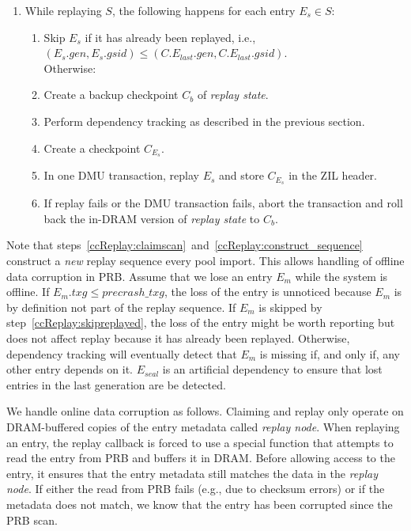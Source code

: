 \documentclass[12pt,a4paper,twoside]{book}
\begin{document}
\begin{enumerate}[noitemsep,beginpenalty=100000,midpenalty=100000]
    \item While replaying $S$, the following happens for each entry $E_s \in S$:
        \begin{enumerate}[noitemsep,beginpenalty=100000,midpenalty=100000]
            \item \label{ccReplay:skipreplayed} Skip $E_s$ if it has already been replayed, i.e., \\
            \mbox{$(E_s.gen, E_s.gsid) \le (C.E_{last}.gen, C.E_{last}.gsid)$}. \\
            Otherwise:
            \item Create a backup checkpoint $C_b$ of \textit{replay state}.
            \item Perform dependency tracking as described in the previous section.
            \item Create a checkpoint $C_{E_s}$.
            \item In one DMU transaction, replay $E_s$ and store $C_{E_s}$ in the ZIL header.
            \item If replay fails or the DMU transaction fails, abort the transaction and roll back the in-DRAM version of \textit{replay state} to $C_b$.
    \end{enumerate}
\end{enumerate}

Note that steps~\ref{ccReplay:claimscan}~and~\ref{ccReplay:construct_sequence} construct a \textit{new} replay sequence every pool import.
This allows handling of offline data corruption in PRB.
Assume that we lose an entry $E_m$ while the system is offline.
If $E_m.txg \le precrash\_txg$, the loss of the entry is unnoticed because $E_m$ is by definition not part of the replay sequence.
If $E_m$ is skipped by step~\ref{ccReplay:skipreplayed}, the loss of the entry might be worth reporting but does not affect replay because it has already been replayed.
Otherwise, dependency tracking will eventually detect that $E_m$ is missing if, and only if, any other entry depends on it.
$E_{seal}$ is an artificial dependency to ensure that lost entries in the last generation are be detected.

We handle online data corruption as follows.
Claiming and replay only operate on DRAM-buffered copies of the entry metadata called \textit{replay node}.
When replaying an entry, the replay callback is forced to use a special function that attempts to read the entry from PRB and buffers it in DRAM.
Before allowing access to the entry, it ensures that the entry metadata still matches the data in the \textit{replay node}.
If either the read from PRB fails (e.g., due to checksum errors) or if the metadata does not match, we know that the entry has been corrupted since the PRB scan.
\end{document}
